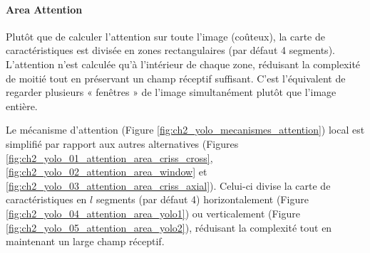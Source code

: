 \paragraph{Area Attention}
Plutôt que de calculer l'attention sur toute l'image (coûteux), la carte de caractéristiques est divisée en zones rectangulaires (par défaut 4 segments). L'attention n'est calculée qu'à l'intérieur de chaque zone, réduisant la complexité de moitié tout en préservant un champ réceptif suffisant. C'est l'équivalent de regarder plusieurs « fenêtres » de l'image simultanément plutôt que l'image entière.

Le mécanisme d'attention (Figure \ref{fig:ch2_yolo_mecanismes_attention}) local est simplifié par rapport aux autres alternatives (Figures \ref{fig:ch2_yolo_01_attention_area_criss_cross}, \ref{fig:ch2_yolo_02_attention_area_window} et \ref{fig:ch2_yolo_03_attention_area_criss_axial}). Celui-ci divise la carte de caractéristiques en $l$ segments (par défaut 4) horizontalement (Figure \ref{fig:ch2_yolo_04_attention_area_yolo1}) ou verticalement (Figure \ref{fig:ch2_yolo_05_attention_area_yolo2}), réduisant la complexité tout en maintenant un large champ réceptif.

